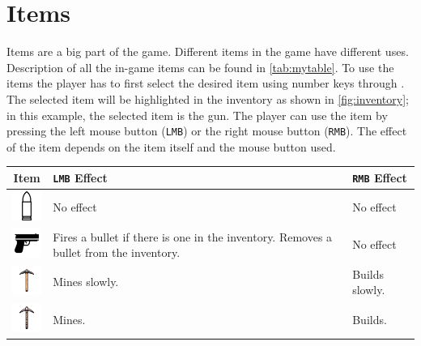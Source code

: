 \section{Items}
Items are a big part of the game.
Different items in the game have different uses.
Description of all the in-game items can be found in \autoref{tab:mytable}.
To use the items the player has to first select the desired item using number keys  through .
The selected item will be highlighted in the inventory as shown in \autoref{fig:inventory}; in this example, the selected item is the gun.
The player can use the item by pressing the left mouse button (\texttt{LMB}) or the right mouse button (\texttt{RMB}).
The effect of the item depends on the item itself and the mouse button used.

\begin{table}[h]
    \centering
    \begin{tabular}{|c|p{5cm}|p{5cm}|}
        \hline
        Item                                                                         & \texttt{LMB} Effect                                                                   & \texttt{RMB} Effect \\
        \hline
        \includegraphics[width=1cm]{chapters/user_manual/resources/bullet.png}       & No effect                                                                             & No effect           \\
        \hline
        \includegraphics[width=1cm]{chapters/user_manual/resources/pistol.png}       & Fires a bullet if there is one in the inventory. Removes a bullet from the inventory. & No effect           \\
        \hline
        \includegraphics[width=1cm]{chapters/user_manual/resources/pickaxe-slow.png} & Mines slowly.                                                                         & Builds slowly.      \\
        \hline
        \includegraphics[width=1cm]{chapters/user_manual/resources/pickaxe-mid.png}  & Mines.                                                                                & Builds.             \\

\end{tabular}
\end{table}
